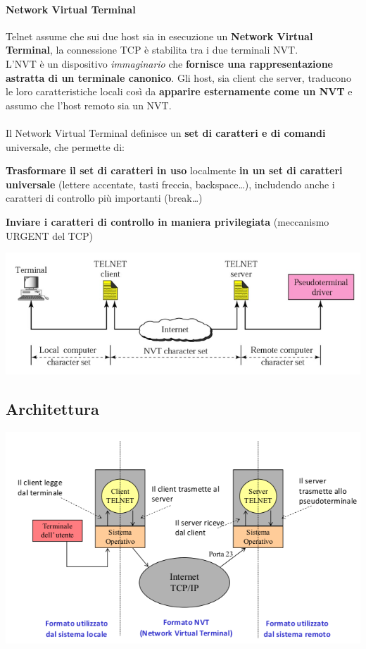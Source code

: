 \documentclass[10pt]{article}
\begin{document}
\paragraph{Network Virtual Terminal} Telnet assume che sui due host sia in esecuzione un \textbf{Network Virtual Terminal}, la connessione TCP è stabilita tra i due terminali NVT.\\
L'NVT è un dispositivo \textit{immaginario} che \textbf{fornisce una rappresentazione astratta di un terminale canonico}. Gli host, sia client che server, traducono le loro caratteristiche locali così da \textbf{apparire esternamente come un NVT} e assumo che l'host remoto sia un NVT.\\\\
Il Network Virtual Terminal definisce un \textbf{set di caratteri e di comandi} universale, che permette di:
\begin{list}{}{}
\item \textbf{Trasformare il set di caratteri in uso} localmente \textbf{in un set di caratteri universale} (lettere accentate, tasti freccia, backspace\ldots), includendo anche i caratteri di controllo più importanti (break\ldots)
\item \textbf{Inviare i caratteri di controllo in maniera privilegiata} (meccanismo URGENT del TCP)
\end{list}
\includegraphics[scale=0.75]{NVT.png}\\
\subsection{Architettura}
\includegraphics[scale=0.75]{telnetarch.png}
\pagebreak
\end{document}
